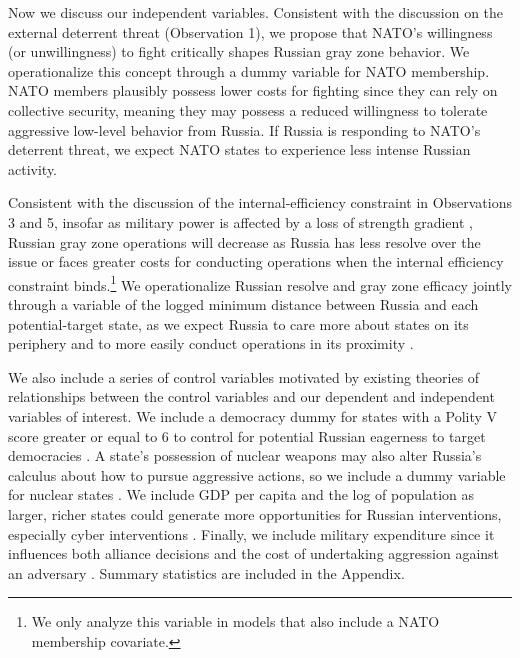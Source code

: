 \documentclass[11pt,letterpaper,pdftex,dvipsnames,table]{article}
\begin{document}
Now we discuss our independent variables. Consistent with the discussion on the external deterrent threat (Observation 1), we propose that NATO's willingness (or unwillingness) to fight critically shapes Russian gray zone behavior. We operationalize this concept through a dummy variable for NATO membership. NATO members plausibly possess lower costs for fighting since they can rely on collective security, meaning they may possess a reduced willingness to tolerate aggressive low-level behavior from Russia. If Russia is responding to NATO's deterrent threat, we expect NATO states to experience less intense Russian activity.

Consistent with the discussion of the internal-efficiency constraint in Observations 3 and 5, insofar as military power is affected by a loss of strength gradient \citep{posen_commandcommonsmilitary_2003}, Russian gray zone operations will decrease as Russia has less resolve over the issue or faces greater costs for conducting operations when the internal efficiency constraint binds.\footnote{We only analyze this variable in models that also include a NATO membership covariate.} We operationalize Russian resolve and gray zone efficacy jointly through a variable of the logged minimum distance between Russia and each potential-target state, as we expect Russia to care more about states on its periphery and to more easily conduct operations in its proximity \citep{weidmann_geographyinternationalsystem_2010}.

We also include a series of control variables motivated by existing theories of relationships between the control variables and our dependent and independent variables of interest. We include a democracy dummy for states with a Polity V score greater or equal to 6 to control for potential Russian eagerness to target democracies \citep{early_nuclearweaponsexistential_2018}. A state's possession of nuclear weapons may also alter Russia's calculus about how to pursue aggressive actions, so we include a dummy variable for nuclear states \citep{gartzke_strategicapproachnuclear_2009}. We include GDP per capita and the log of population as larger, richer states could generate more opportunities for Russian interventions, especially cyber interventions \citep{beckley_economicdevelopmentmilitary_2010}. Finally, we include military expenditure since it influences both alliance decisions and the cost of undertaking aggression against an adversary \citep{omitoogun_militaryexpendituredata_2006}. Summary statistics are included in the Appendix.
\end{document}
